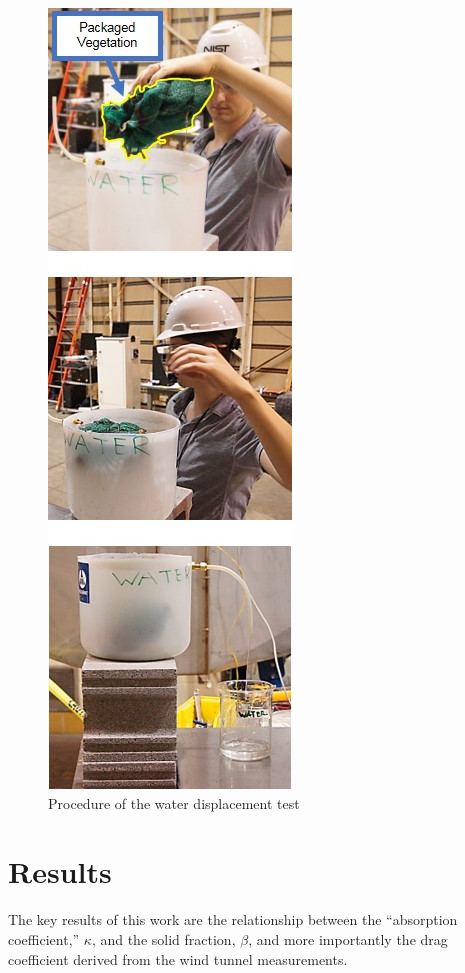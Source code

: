 \documentclass[12pt]{article}
\begin{document}
\begin{figure} [!]
	\centering 	\includegraphics[height=0.95\textheight,keepaspectratio]{Picture7.jpg}
	\caption{Procedure of the water displacement test}
	\label{fig:wdt}
\end{figure}

\pagebreak



\section{Results}
\label{sec:results}

The key results of this work are the relationship between the ``absorption coefficient,'' $\kappa$, and the solid fraction, $\beta$, and more importantly the drag coefficient derived from the wind tunnel measurements.
\end{document}
